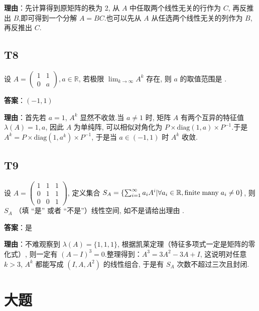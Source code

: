 \documentclass{article}
\begin{document}
\par \textbf{理由}：先计算得到原矩阵的秩为 2, 从 $A$ 中任取两个线性无关的行作为 $C$, 再反推出 $B$,即可得到一个分解 $A=BC$.也可以先从 $A$ 从任选两个线性无关的列作为 $B$, 再反推出 $C$.

\subsection{T8}

\par 设 $A=\begin{pmatrix}
	1 & 1\\
	0 & a
\end{pmatrix}, a\in \mathbb R$, 若极限 $\lim_{k\to \infty}A^k$ 存在, 则 $a$ 的取值范围是 \underline{\phantom{empty\_space}}.

\par \textbf{答案}：$(-1, 1)$

\par \textbf{理由}：首先若 $a=1$, $A^k$ 显然不收敛.当 $a\neq 1$ 时, 矩阵 $A$ 有两个互异的特征值 $\lambda(A)={1, a}$, 因此 $A$ 为单纯阵, 可以相似对角化为 $P\times \text{diag}(1, a)\times P^{-1}$.于是 $A^k=P\times \text{diag}(1, a^k)\times P^{-1}$, 于是当 $a\in(-1, 1)$ 时 $A^k$ 收敛.

\subsection{T9}

\par 设 $A=\begin{pmatrix}
	1 & 1 & 1\\
	0 & 1 & 1\\
	0 & 0 & 1
\end{pmatrix}$, 定义集合 $S_A=\{\sum_{i=1}^\infty a_iA^i|\forall a_i\in \mathbb R, \text{finite\;many\;} a_i\neq 0\}$, 则 $S_A$ \underline{\phantom{empty\_space}}（填 “是” 或者 “不是”）线性空间, 如不是请给出理由 \underline{\phantom{empty\_space}} .

\par \textbf{答案}：是

\par \textbf{理由}：不难观察到 $\lambda(A)=\{1, 1, 1\}$, 根据凯莱定理（特征多项式一定是矩阵的零化式）, 则一定有 $(A-I)^3=0$.整理得到：$A^3=3A^2-3A+I$, 这说明对任意 $k>3$, $A^k$ 都能写成 $(I, A, A^2)$ 的线性组合, 于是有 $S_A$ 次数不超过三次且封闭.

\section{大题}
\end{document}
